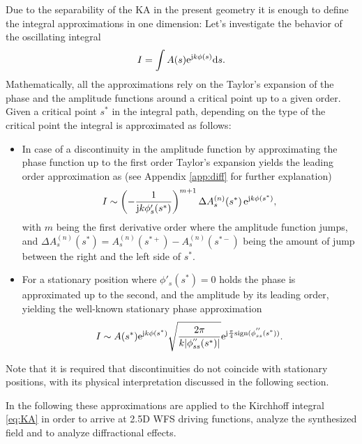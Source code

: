 \documentclass[lettersize,journal]{IEEEtran}
\begin{document}
Due to the separability of the KA in the present geometry it is enough to define the integral approximations in one dimension:
Let's investigate the behavior of the oscillating integral 
\begin{equation}
  I = \int A(s) \mathrm{e}^{\mathrm{j} k \phi(s)} \mathrm{d} s.
\end{equation}
Mathematically, all the approximations rely on the Taylor's expansion of the phase and the amplitude functions around a critical point up to a given order.
Given a critical point $s^*$ in the integral path, depending on the type of the critical point the integral is approximated as follows:
\begin{itemize}
  \item In case of a discontinuity in the amplitude function by approximating the phase function up to the first order Taylor's expansion yields the leading order approximation as (see Appendix \ref{app:diff} for further explanation)
  \begin{equation}
    \small
    I \sim\left( -\frac{1}{\mathrm{j} k \phi'_s(s^*)} \right)^{m+1}  \Delta A_{s}^{(n)}(s^*) \, \mathrm{e}^{\mathrm{j} k \phi(s^*)},
    \label{eq:endpoint_I}
  \end{equation}
  with $m$ being the first derivative order where the amplitude function jumps, and $\Delta A_{s}^{(n)}(s^*) = A_{s}^{(n)}(s^{*+})  - A_{s}^{(n)}(s^{*-})$ being the amount of jump between the right and the left side of $s^*$.   
  \item For a stationary position where $\phi'_s(s^*) = 0$ holds the phase is approximated up to the second, and the amplitude by its leading order, yielding the well-known stationary phase approximation 
  \begin{equation}
    I \sim  
    A(s^*)
    \mathrm{e}^{\mathrm{j} k \phi(s^*)} \sqrt{\frac{2\pi}{k |\phi^{''}_{ss}(s^*)|}} \mathrm{e}^{\mathrm{j} \frac{\pi}{4}\mathrm{sign}(\phi^{''}_{ss}(s^*))}.
    \label{eq:SPA_def1}
\end{equation}
\end{itemize}
Note that it is required that discontinuities do not coincide with stationary positions, with its physical interpretation discussed in the following section.

In the following these approximations are applied to the Kirchhoff integral \eqref{eq:KA} in order to arrive at 2.5D WFS driving functions, analyze the synthesized field and to analyze diffractional effects.
\end{document}
